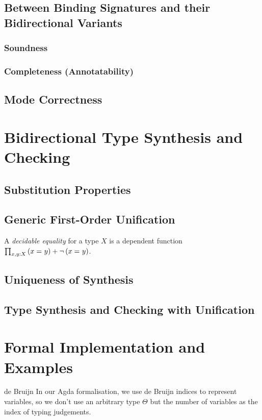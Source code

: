 \documentclass[acmsmall,screen]{acmart}
\theoremstyle{acmdefinition}
\begin{document}
\begin{example}
  
\end{example}


\subsection{Between Binding Signatures and their Bidirectional Variants}
\subsubsection{Soundness}
\subsubsection{Completeness (Annotatability)}
\subsection{Mode Correctness}

\section{Bidirectional Type Synthesis and Checking}

\subsection{Substitution Properties}
\subsection{Generic First-Order Unification}
\cite{McBride2003,McBride2003a}
\begin{definition}
A \emph{decidable equality} for a type $X$ is a dependent function $\prod_{x, y : X} \left(x =_{} y\right) + \neg \left(x =_{} y\right)$.
\end{definition}
 
\subsection{Uniqueness of Synthesis}

\subsection{Type Synthesis and Checking with Unification}

\section{Formal Implementation and Examples}
\begin{LTannote}{de Bruijn}
  In our Agda formalisation, we use de Bruijn indices to represent variables, so we don't use an arbitrary type $\Theta$ but the number of variables as the index of typing judgements.
\end{LTannote}
\end{document}
